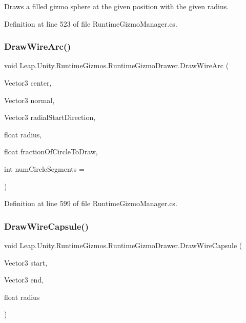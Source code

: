 Draws a filled gizmo sphere at the given position with the given radius. 



Definition at line 523 of file Runtime\+Gizmo\+Manager.\+cs.

\mbox{\label{class_leap_1_1_unity_1_1_runtime_gizmos_1_1_runtime_gizmo_drawer_a03a1f0a8e07e77a5d33cbd11efd7066e}} 
\subsubsection{\texorpdfstring{DrawWireArc()}{DrawWireArc()}}
{\footnotesize\ttfamily void Leap.\+Unity.\+Runtime\+Gizmos.\+Runtime\+Gizmo\+Drawer.\+Draw\+Wire\+Arc (\begin{DoxyParamCaption}\item[{Vector3}]{center,  }\item[{Vector3}]{normal,  }\item[{Vector3}]{radial\+Start\+Direction,  }\item[{float}]{radius,  }\item[{float}]{fraction\+Of\+Circle\+To\+Draw,  }\item[{int}]{num\+Circle\+Segments = {} }\end{DoxyParamCaption})}



Definition at line 599 of file Runtime\+Gizmo\+Manager.\+cs.

\mbox{\label{class_leap_1_1_unity_1_1_runtime_gizmos_1_1_runtime_gizmo_drawer_a42b99c3009d495968bde636b7a88ea23}} 
\subsubsection{\texorpdfstring{DrawWireCapsule()}{DrawWireCapsule()}}
{\footnotesize\ttfamily void Leap.\+Unity.\+Runtime\+Gizmos.\+Runtime\+Gizmo\+Drawer.\+Draw\+Wire\+Capsule (\begin{DoxyParamCaption}\item[{Vector3}]{start,  }\item[{Vector3}]{end,  }\item[{float}]{radius }\end{DoxyParamCaption})}



